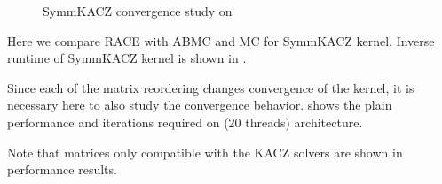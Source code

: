 \begin{figure}[thbp]
	\centering
	\hspace{1em}
	\caption{\acrshort{SymmKACZ} convergence study on \SKX}
	\label{fig:symmkacz_convergence}
\end{figure}
Here we compare  \acrshort{RACE} with \acrshort{ABMC} and \acrshort{MC} for \acrshort{SymmKACZ} kernel. Inverse runtime of \acrshort{SymmKACZ} kernel is shown in .

 Since each of the matrix reordering changes convergence of the kernel, it is necessary here to also study the convergence behavior.  shows the plain performance and iterations required on \SKX (20 threads) architecture.

Note that matrices only compatible with the \acrshort{KACZ} solvers are shown in performance results.

